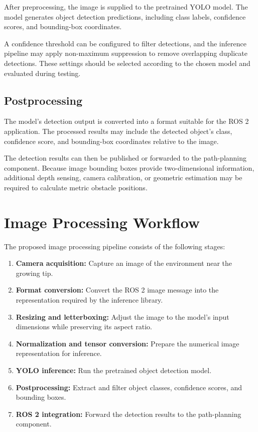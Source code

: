 After preprocessing, the image is supplied to the pretrained YOLO model. The model generates object detection predictions, including class labels, confidence scores, and bounding-box coordinates.

A confidence threshold can be configured to filter detections, and the inference pipeline may apply non-maximum suppression to remove overlapping duplicate detections. These settings should be selected according to the chosen model and evaluated during testing.

\subsection{Postprocessing}

The model's detection output is converted into a format suitable for the ROS 2 application. The processed results may include the detected object's class, confidence score, and bounding-box coordinates relative to the image.

The detection results can then be published or forwarded to the path-planning component. Because image bounding boxes provide two-dimensional information, additional depth sensing, camera calibration, or geometric estimation may be required to calculate metric obstacle positions.

\section{Image Processing Workflow}

The proposed image processing pipeline consists of the following stages:

\begin{enumerate}
    \item \textbf{Camera acquisition:} Capture an image of the environment near the growing tip.
    \item \textbf{Format conversion:} Convert the ROS 2 image message into the representation required by the inference library.
    \item \textbf{Resizing and letterboxing:} Adjust the image to the model's input dimensions while preserving its aspect ratio.
    \item \textbf{Normalization and tensor conversion:} Prepare the numerical image representation for inference.
    \item \textbf{YOLO inference:} Run the pretrained object detection model.
    \item \textbf{Postprocessing:} Extract and filter object classes, confidence scores, and bounding boxes.
    \item \textbf{ROS 2 integration:} Forward the detection results to the path-planning component.
\end{enumerate}

